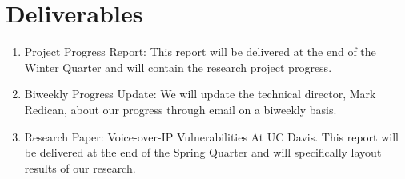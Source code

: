 \section{Deliverables}

\begin{enumerate}
  \item Project Progress Report: This report will be delivered at the end of the Winter Quarter and will contain the research project progress.
  \item Biweekly Progress Update: We will update the technical director, Mark Redican, about our progress through email on a biweekly basis.
  \item Research Paper: Voice-over-IP Vulnerabilities At UC Davis. This report will be delivered at the end of the Spring Quarter and will specifically layout results of our research.
  
\end{enumerate}
